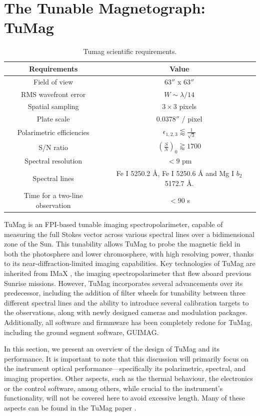 \section{The Tunable Magnetograph: TuMag}

\begin{table}
    \centering
   \begin{tabular}{cc}
    \hline
    \hline
    Requirements & Value \\
    \hline
    Field of view & $63''$ x $63''$ \\
    RMS wavefront error & $W \sim \lambda / 14$\\
    Spatial sampling & $3 \times 3 $ pixels \\
    Plate scale & $0.0378''$ / pixel \\
    Polarimetric efficiencies & $\epsilon _ {1, 2, 3} \lessapprox \frac{1}{\sqrt{3}}$\\
    S/N ratio & $\left(\frac{S}{N}\right) _ 0 \gtrapprox 1700$ \\
    Spectral resolution & $< 9$ pm\\  
    Spectral lines & Fe I 5250.2 \r{A}, Fe I 5250.6 \r{A} and Mg I $b_2$ 5172.7 \r{A}. \\
    Time for a two-line observation & $< 90$ s\\
    \hline
    \hline
    \end{tabular}
    \caption{Tumag scientific requirements.}
    \label{table: Tumags requirements}
\end{table}

TuMag is an FPI-based tunable imaging spectropolarimeter, capable of measuring the full Stokes vector across various spectral lines over a bidimensional zone of the Sun. This tunability allows TuMag to probe the magnetic field in both the photosphere and lower chromosphere, with high resolving power, thanks to its near-diffraction-limited imaging capabilities. Key technologies of TuMag are inherited from IMaX \citep{IMaX}, the imaging spectropolarimeter that flew aboard previous Sunrise missions. However, TuMag incorporates several advancements over its predecessor, including the addition of filter wheels for tunability between three different spectral lines and the ability to introduce several calibration targets to the observations, along with newly designed cameras and modulation packages. Additionally, all software and firmmware has been completely redone for TuMag, including the ground segment software, GUIMAG.

In this section, we present an overview of the design of TuMag  and its performance. It is important to note that this discussion will primarily focus on the instrument optical performance—specifically its polarimetric, spectral, and imaging properties. Other aspects, such as the thermal behaviour, the electronics or the control software, among others, while crucial to the instrument's functionality, will not be covered here to avoid excessive length. Many of these aspects can be found in the TuMag paper \citep{tumag}.

